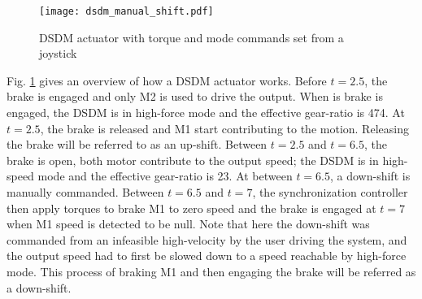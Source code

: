 %
%
\begin{figure}[hb]
	\centering
		\texttt{[image: dsdm\_manual\_shift.pdf]}
	\caption[DSDM actuator behavior overview]{DSDM actuator with torque and mode commands set from a joystick}
	\label{fig:dsdm_manual_shift}
\end{figure}
%
Fig. \ref{fig:dsdm_manual_shift} gives an overview of how a DSDM actuator works. Before $t=2.5$, the brake is engaged and only M2 is used to drive the output. When is brake is engaged, the DSDM is in high-force mode and the effective gear-ratio is 474. At $t=2.5$, the brake is released and M1 start contributing to the motion. Releasing the brake will be referred to as an up-shift. Between $t=2.5$ and $t=6.5$, the brake is open, both motor contribute to the output speed; the DSDM is in high-speed mode and the effective gear-ratio is 23. At between $t=6.5$, a down-shift is manually commanded. Between $t=6.5$ and $t=7$, the synchronization controller then apply torques to brake M1 to zero speed and the brake is engaged at $t=7$ when M1 speed is detected to be null. Note that here the down-shift was commanded from an infeasible high-velocity by the user driving the system, and the output speed had to first be slowed down to a speed reachable by high-force mode. This process of braking M1 and then engaging the brake will be referred as a down-shift.


